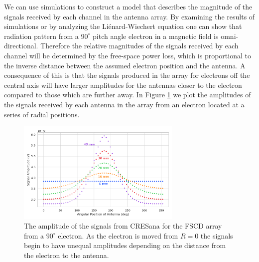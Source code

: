 We can use simulations to construct a model that describes the magnitude of the signals received by each channel in the antenna array. By examining the results of simulations or by analyzing the Li\'{e}nard-Wiechert equation one can show that radiation pattern from a $90^\circ$ pitch angle electron in a magnetic field is omni-directional. Therefore the relative magnitudes of the signals received by each channel will be determined by the free-space power loss, which is proportional to the inverse distance between the assumed electron position and the antenna. A consequence of this is that the signals produced in the array for electrons off the central axis will have larger amplitudes for the antennas closer to the electron compared to those which are further away. In Figure \ref{fig:cresana_mags} we plot the amplitudes of the signals received by each antenna in the array from an electron located at a series of radial positions.
\begin{figure}[htbp]
    \centering
    \includegraphics[width=0.7\textwidth]{figs/Chapter-5/230508_cresana_mags.png}
    \caption{The amplitude of the signals from CRESana for the FSCD array from a $90^\circ$ electron. As the electron is moved from $R=0$ the signals begin to have unequal amplitudes depending on the distance from the electron to the antenna.}
    \label{fig:cresana_mags}
\end{figure}

